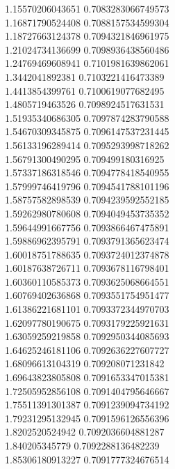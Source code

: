 {1.15570206043651 0.7083283066749573 \\
1.16871790524408 0.7088157534599304 \\
1.18727663124378 0.7094321846961975 \\
1.21024734136699 0.7098936438560486 \\
1.24769469608941 0.7101981639862061 \\
1.3442041892381 0.7103221416473389 \\
1.4413854399761 0.7100619077682495 \\
1.4805719463526 0.7098924517631531 \\
1.51935340686305 0.7097874283790588 \\
1.54670309345875 0.7096147537231445 \\
1.56133196289414 0.7095293998718262 \\
1.56791300490295 0.709499180316925 \\
1.57337186318546 0.7094778418540955 \\
1.57999746419796 0.7094541788101196 \\
1.58757582898539 0.7094239592552185 \\
1.59262980780608 0.7094049453735352 \\
1.59644991667756 0.7093866467475891 \\
1.59886962395791 0.7093791365623474 \\
1.60018751788635 0.7093724012374878 \\
1.60187638726711 0.7093678116798401 \\
1.60360110585373 0.7093625068664551 \\
1.60769402636868 0.7093551754951477 \\
1.61386221681101 0.7093372344970703 \\
1.62097780190675 0.7093179225921631 \\
1.63059259219858 0.7092950344085693 \\
1.64625246181106 0.7092636227607727 \\
1.68096613104319 0.709208071231842 \\
1.69643823805808 0.7091653347015381 \\
1.72505952856108 0.7091404795646667 \\
1.75511391301387 0.7091239094734192 \\
1.79231295132945 0.7091596126556396 \\
1.8202520524942 0.7092036604881287 \\
1.840205345779 0.7092288136482239 \\
1.85306180913227 0.7091777324676514 \\
}

